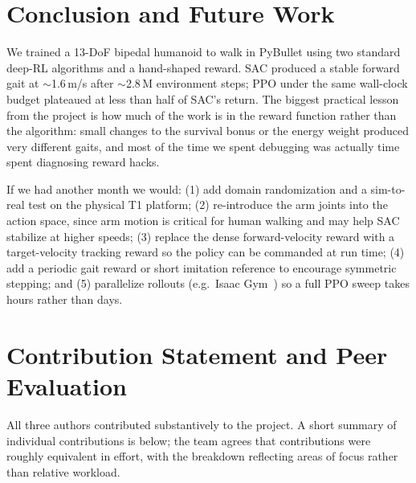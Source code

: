 \documentclass[sigconf,nonacm]{acmart}
\begin{document}
\section{Conclusion and Future Work}\label{sec:conclusion}
We trained a 13-DoF bipedal humanoid to walk in PyBullet using two standard
deep-RL algorithms and a hand-shaped reward. SAC produced a stable forward
gait at $\sim$1.6\,m/s after $\sim$2.8\,M environment steps; PPO under the
same wall-clock budget plateaued at less than half of SAC's return. The
biggest practical lesson from the project is how much of the work is in the
reward function rather than the algorithm: small changes to the survival
bonus or the energy weight produced very different gaits, and most of the
time we spent debugging was actually time spent diagnosing reward hacks.

If we had another month we would: (1) add domain randomization and a
sim-to-real test on the physical T1 platform; (2) re-introduce the arm joints
into the action space, since arm motion is critical for human walking and may
help SAC stabilize at higher speeds; (3) replace the dense forward-velocity
reward with a target-velocity tracking reward so the policy can be commanded
at run time; (4) add a periodic gait reward or short imitation reference to
encourage symmetric stepping; and (5) parallelize rollouts (e.g.\ Isaac
Gym~\cite{rudin2022learn}) so a full PPO sweep takes hours rather than days.

\section{Contribution Statement and Peer Evaluation}\label{sec:contributions}
All three authors contributed substantively to the project. A short summary
of individual contributions is below; the team agrees that contributions were
roughly equivalent in effort, with the breakdown reflecting areas of focus
rather than relative workload.
\end{document}

